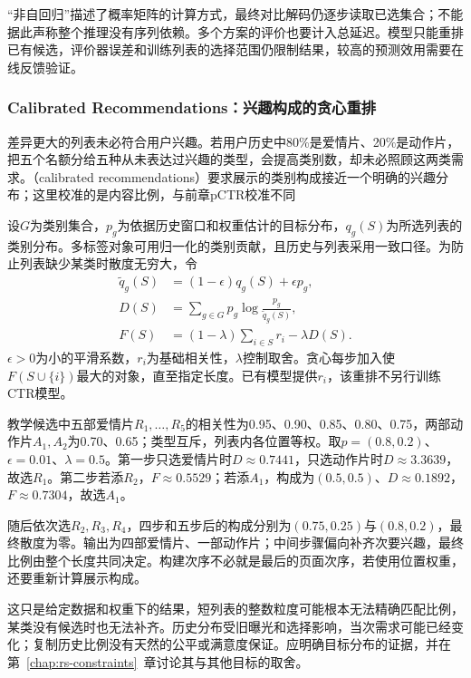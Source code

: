 “非自回归”描述了概率矩阵的计算方式，最终对比解码仍逐步读取已选集合；不能据此声称整个推理没有序列依赖。多个方案的评价也要计入总延迟。模型只能重排已有候选，评价器误差和训练列表的选择范围仍限制结果，较高的预测效用需要在线反馈验证。

\subsubsection{Calibrated Recommendations：兴趣构成的贪心重排}
\label{sec:rs-calibrated-recommendations}

差异更大的列表未必符合用户兴趣。若用户历史中80\%是爱情片、20\%是动作片，把五个名额分给五种从未表达过兴趣的类型，会提高类别数，却未必照顾这两类需求。（calibrated recommendations）要求展示的类别构成接近一个明确的兴趣分布；这里校准的是内容比例，与前章pCTR校准不同

设$G$为类别集合，$p_g$为依据历史窗口和权重估计的目标分布，$q_g(S)$为所选列表的类别分布。多标签对象可用归一化的类别贡献，且历史与列表采用一致口径。为防止列表缺少某类时散度无穷大，令
\begin{align}
 \widetilde q_g(S)&=(1-\epsilon)q_g(S)+\epsilon p_g,\\
 D(S)&=\sum_{g\in G}p_g\log\frac{p_g}{\widetilde q_g(S)},\\
 F(S)&=(1-\lambda)\sum_{i\in S}r_i-\lambda D(S).
 \label{eq:rs-calibrated-greedy}
\end{align}
$\epsilon>0$为小的平滑系数，$r_i$为基础相关性，$\lambda$控制取舍。贪心每步加入使$F(S\cup\{i\})$最大的对象，直至指定长度。已有模型提供$r_i$，该重排不另行训练CTR模型。

教学候选中五部爱情片$R_1,\ldots,R_5$的相关性为0.95、0.90、0.85、0.80、0.75，两部动作片$A_1,A_2$为0.70、0.65；类型互斥，列表内各位置等权。取$p=(0.8,0.2)$、$\epsilon=0.01$、$\lambda=0.5$。第一步只选爱情片时$D\approx0.7441$，只选动作片时$D\approx3.3639$，故选$R_1$。第二步若添$R_2$，$F\approx0.5529$；若添$A_1$，构成为$(0.5,0.5)$、$D\approx0.1892$，$F\approx0.7304$，故选$A_1$。

随后依次选$R_2,R_3,R_4$，四步和五步后的构成分别为$(0.75,0.25)$与$(0.8,0.2)$，最终散度为零。输出为四部爱情片、一部动作片；中间步骤偏向补齐次要兴趣，最终比例由整个长度共同决定。构建次序不必就是最后的页面次序，若使用位置权重，还要重新计算展示构成。

这只是给定数据和权重下的结果，短列表的整数粒度可能根本无法精确匹配比例，某类没有候选时也无法补齐。历史分布受旧曝光和选择影响，当次需求可能已经变化；复制历史比例没有天然的公平或满意度保证。应明确目标分布的证据，并在第~\ref{chap:rs-constraints}~章讨论其与其他目标的取舍。

